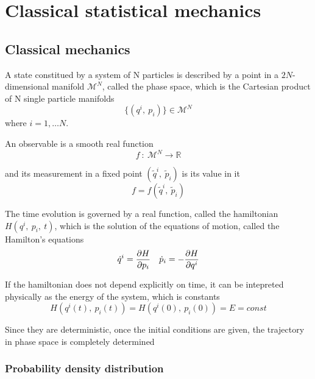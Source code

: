 \part{Classical statistical mechanics}

\chapter{Classical mechanics}

    A state constitued by a system of N particles is described by a point in a $2N$-dimensional manifold $\mathcal M^N$, called the phase space, which is the Cartesian product of N single particle manifolds 
    \begin{equation*}
        \{(q^i, ~p_i)\} \in \mathcal M^N
    \end{equation*}
    where $i = 1, \ldots N$.

    An observable is a smooth real function 
    \begin{equation*}
        f ~\colon~ \mathcal M^N \rightarrow \mathbb R
    \end{equation*}

    and its measurement in a fixed point $(\tilde q^i, ~\tilde p_i)$ is its value in it 
    \begin{equation*}
        f = f(\tilde q^i, ~\tilde p_i)
    \end{equation*}

    The time evolution is governed by a real function, called the hamiltonian $H(q^i, ~p_i, ~t)$, which is the solution of the equations of motion, called the Hamilton's equations
    \begin{equation*}
        \dot q^i = \frac{\partial H}{\partial p_i} \quad \dot p_i = - \frac{\partial H}{\partial q^i}
    \end{equation*}
    
    \begin{theorem} \label{consen}
        If the hamiltonian does not depend explicitly on time, it can be intepreted physically as the energy of the system, which is constants
        \begin{equation*}
            H(q^i(t), ~p_i(t)) = H(q^i(0), ~p_i(0)) = E = const
        \end{equation*}
    \end{theorem}

    Since they are deterministic, once the initial conditions are given, the trajectory in phase space is completely determined

\section{Probability density distribution}

